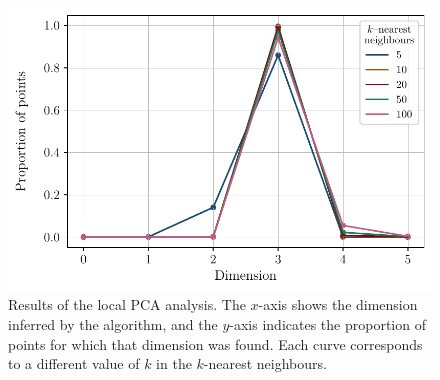 \documentclass[11pt,a4paper]{article}
\begin{document}
	\begin{figure}[!b]
		\centering
		\includegraphics[scale=0.75]{Figures/Local_PCA_21_05_2025.pdf}
		\caption{Results of the local PCA analysis. The $x$-axis shows the dimension inferred by the algorithm, and the $y$-axis indicates the proportion of points for which that dimension was found. Each curve corresponds to a different value of $k$ in the $k$-nearest neighbours.}
		\label{fig:local_pca}
	\end{figure}
	
\end{document}
